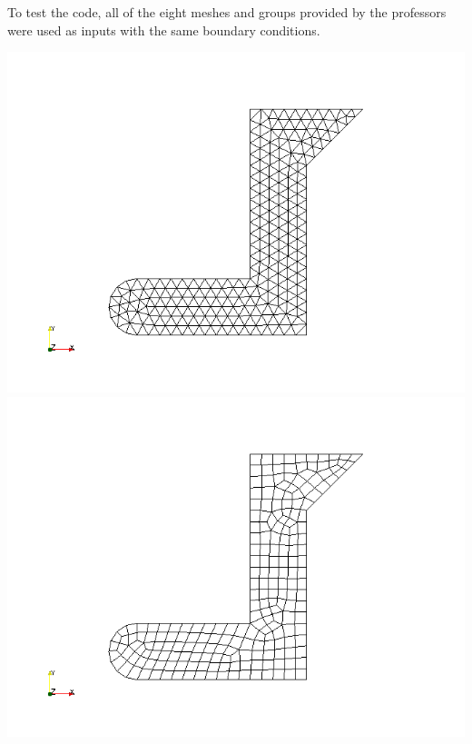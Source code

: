 \documentclass[paper=a4, fontsize=11pt]{article} %
\numberwithin{equation}{section} %
\numberwithin{figure}{section} %
\numberwithin{table}{section} %
\begin{document}
To test the code, all of the eight meshes and groups provided by the professors were used as inputs with the same boundary conditions.

\begin{center}
\includegraphics[scale=0.3]{mesh_tri}\includegraphics[scale=0.3]{mesh_quad}

\end{center}
\end{document}
